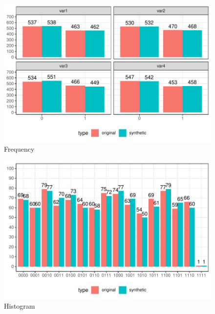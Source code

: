 \documentclass[t,8pt,utfx8]{beamer}
\begin{document}
\begin{spacing}{1.25}
{\begin{minipage}{0.48\textwidth}
    \begin{figure}
        \centering
        \caption{Frequency}
        \includegraphics[width=\textwidth]{../../graphs/graph_cart_frequency_compare.pdf}
    \end{figure}
\end{minipage}
\hfill
\begin{minipage}{0.48\textwidth}
    \begin{figure}
        \centering
        \caption{Histogram}
        \includegraphics[width=\textwidth]{../../graphs/graph_cart_histogram_compare.pdf}
    \end{figure}
\end{minipage}

}



\end{spacing}
\end{document}
